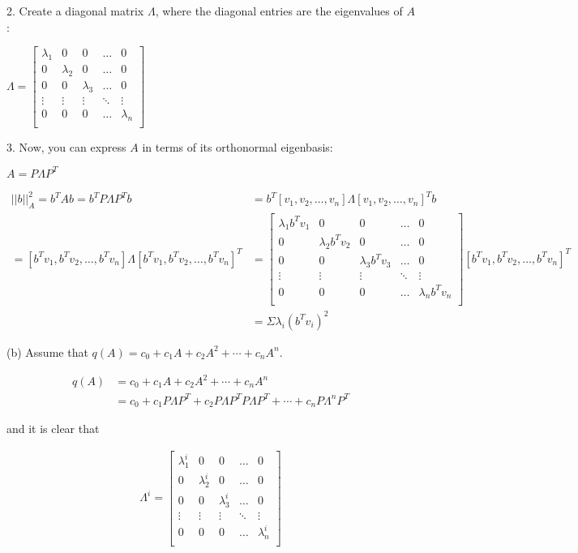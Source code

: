 \documentclass{article}
\begin{document}
\begin{enumerate}[leftmargin=\labelsep]
2. Create a diagonal matrix $\Lambda$, where the diagonal entries are the eigenvalues of $A$:

   $\Lambda = \begin{bmatrix}
   \lambda_1 & 0 & 0 & \ldots & 0 \\
   0 & \lambda_2 & 0 & \ldots & 0 \\
   0 & 0 & \lambda_3 & \ldots & 0 \\
   \vdots & \vdots & \vdots & \ddots & \vdots \\
   0 & 0 & 0 & \ldots & \lambda_n \\
   \end{bmatrix}$

3. Now, you can express $A$ in terms of its orthonormal eigenbasis:

   $A = P\Lambda P^T$

		\begin{align*}
			||b||_A^2 = b^TAb = b^T P\Lambda P^T b &= b^T [v_1, v_2, \ldots, v_n] \Lambda [v_1, v_2, \ldots, v_n]^T b\\
			= [b^Tv_1, b^Tv_2, \ldots, b^Tv_n]\Lambda [b^Tv_1, b^Tv_2, \ldots, b^Tv_n]^T &= \begin{bmatrix}
				\lambda_1b^Tv_1 & 0 & 0 & \ldots & 0 \\
				0 & \lambda_2b^Tv_2 & 0 & \ldots & 0 \\
				0 & 0 & \lambda_3b^Tv_3 & \ldots & 0 \\
				\vdots & \vdots & \vdots & \ddots & \vdots \\
				0 & 0 & 0 & \ldots & \lambda_nb^Tv_n \\
				\end{bmatrix} [b^Tv_1, b^Tv_2, \ldots, b^Tv_n]^T\\
				&=\Sigma \lambda_i (b^Tv_i)^2
		\end{align*}

		(b) Assume that $q(A)= c_0 + c_1 A + c_2 A^2 + \cdots + c_n A^n$.

		\begin{align}
			q(A)&= c_0 + c_1 A + c_2 A^2 + \cdots + c_n A^n\\
			&=c_0 + c_1 P\Lambda P^T + c_2 P\Lambda P^T P\Lambda P^T + \cdots + c_n P\Lambda^n P^T
		\end{align}

		and it is clear that 

		\begin{align}
			\Lambda^i = \begin{bmatrix}
				\lambda_1^i & 0 & 0 & \ldots & 0 \\
				0 & \lambda_2^i & 0 & \ldots & 0 \\
				0 & 0 & \lambda_3^i & \ldots & 0 \\
				\vdots & \vdots & \vdots & \ddots & \vdots \\
				0 & 0 & 0 & \ldots & \lambda_n^i \\
				\end{bmatrix}
		\end{align}


\end{enumerate}
\end{document}
